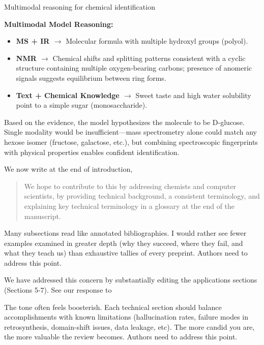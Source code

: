 \begin{reply}
\begin{examplebox}[label={example:multimodal}]{Multimodal reasoning for chemical identification}
\begin{itemize}
\end{itemize}
\textbf{Multimodal Model Reasoning:}
\begin{itemize}
    \item \textbf{MS + IR $\rightarrow$} Molecular formula  with multiple hydroxyl groups (polyol).
    \item \textbf{NMR $\rightarrow$} Chemical shifts and splitting patterns consistent with a cyclic structure containing multiple oxygen-bearing carbons; presence of anomeric signals suggests equilibrium between ring forms.
    \item \textbf{Text + Chemical Knowledge $\rightarrow$} Sweet taste and high water solubility point to a simple sugar (monosaccharide).
\end{itemize}
Based on the evidence, the model hypothesizes the molecule to be D-glucose. Single modality would be insufficient---mass spectrometry alone could match any hexose isomer (fructose, galactose, etc.), but combining spectroscopic fingerprints with physical properties enables confident identification.
\end{examplebox}

We now write at the end of introduction,

\begin{quote}
    We hope to contribute to this by addressing chemists and computer scientists, by providing technical background, a consistent terminology, and explaining key technical terminology in a glossary at the end of the manuscript.
\end{quote}
\end{reply}

\begin{point}
Many subsections read like annotated bibliographies. I would rather see fewer examples examined in greater depth (why they succeed, where they fail, and what they teach us) than exhaustive tallies of every preprint. Authors need to address this point.
\end{point}

\begin{reply}
We have addressed this concern by substantially editing the applications sections (Sections 5-7). 
See our response to 
\end{reply}

\begin{point}
The tone often feels boosterish. Each technical section should balance accomplishments with known limitations (hallucination rates, failure modes in retrosynthesis, domain-shift issues, data leakage, etc). The more candid you are, the more valuable the review becomes. Authors need to address this point.
\end{point}

